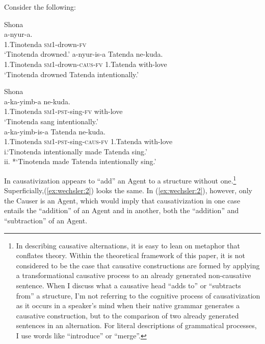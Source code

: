 \documentclass[output=paper,modfonts,nonflat,colorlinks,citecolor=brown]{langsci/langscibook}
\begin{document}
Consider the following:

\ea\label{ex:wechsler:1}
Shona\\
\ea\label{ex:wechsler:1a}  {a-nyur-a}.\\
1.Tinotenda \textsc{sm1-}drown\textsc{-fv}\\
\glt ‘Tinotenda drowned.’
\ex\label{ex:wechsler:1c}  {a-nyur-is-a} {Tatenda} {ne-kuda}.\\
1.Tinotenda \textsc{sm1-}drown\textsc{-caus-fv} {1.Tatenda} {with-love}\\
\glt ‘Tinotenda drowned Tatenda intentionally.’\\
\z
\z

\ea\label{ex:wechsler:2}
Shona\\
\ea\label{ex:wechsler:2a}  {a-ka-yimb-a} {ne-kuda}.\\
1.Tinotenda \textsc{sm1-pst-}sing\textsc{-fv} with-love\\
\glt ‘Tinotenda sang intentionally.’\\
\ex\label{ex:wechsler:2b}  {a-ka-yimb-is-a} {Tatenda} {ne-kuda}.\\
1.Tinotenda \textsc{sm1-pst-}sing\textsc{-caus-fv} 1.Tatenda with-love\\
\glt\label{ex:wechsler:2c} i.‘Tinotenda intentionally made Tatenda sing.’\\
ii. *‘Tinotenda made Tatenda intentionally sing.’
\z
\z

In  causativization appears to “add” an Agent to a structure without one.\footnote{In describing causative alternations, it is easy to lean on metaphor that conflates theory. Within the theoretical framework of this paper, it is not considered to be the case that causative constructions are formed by applying a transformational causative process to an already generated non-causative sentence. When I discuss what a causative head “adds to” or “subtracts from” a structure, I’m not referring to the cognitive process of causativization as it occurs in a speaker’s mind when their native grammar generates a causative construction, but to the comparison of two already generated sentences in an alternation. For literal descriptions of grammatical processes, I use words like “introduce” or “merge”.} Superficially,(\ref{ex:wechsler:2}) looks the same. In (\ref{ex:wechsler:2}), however, only the Causer is an Agent, which would imply that causativization in one case entails the “addition” of an Agent and in another, both the “addition” and “subtraction” of an Agent.
\end{document}
